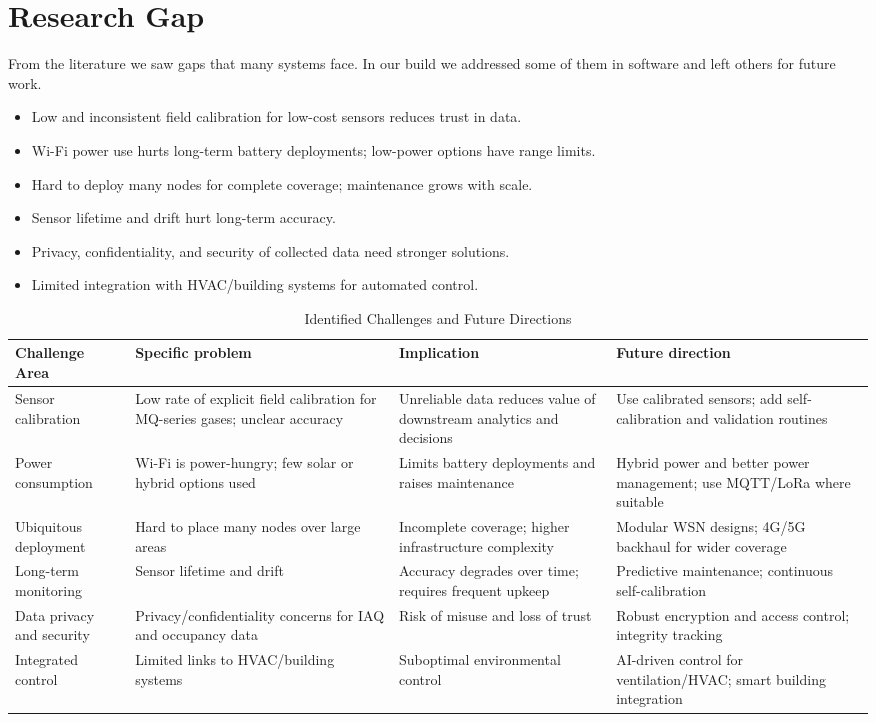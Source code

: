 \documentclass[12pt]{report}
\begin{document}
\section{Research Gap}
From the literature we saw gaps that many systems face. In our build we addressed some of them in software and left others for future work.
\begin{itemize}
  \item Low and inconsistent field calibration for low-cost sensors reduces trust in data.
  \item Wi-Fi power use hurts long-term battery deployments; low-power options have range limits.
  \item Hard to deploy many nodes for complete coverage; maintenance grows with scale.
  \item Sensor lifetime and drift hurt long-term accuracy.
  \item Privacy, confidentiality, and security of collected data need stronger solutions.
  \item Limited integration with HVAC/building systems for automated control.
\end{itemize}

\begin{table}[h]
\centering
\small
\caption{Identified Challenges and Future Directions}
\begin{tabularx}{\textwidth}{|p{3cm}|X|X|X|}
\hline
\textbf{Challenge Area} & \textbf{Specific problem} & \textbf{Implication} & \textbf{Future direction} \\
\hline
Sensor calibration & Low rate of explicit field calibration for MQ-series gases; unclear accuracy & Unreliable data reduces value of downstream analytics and decisions & Use calibrated sensors; add self-calibration and validation routines \\
\hline
Power consumption & Wi-Fi is power-hungry; few solar or hybrid options used & Limits battery deployments and raises maintenance & Hybrid power and better power management; use MQTT/LoRa where suitable \\
\hline
Ubiquitous deployment & Hard to place many nodes over large areas & Incomplete coverage; higher infrastructure complexity & Modular WSN designs; 4G/5G backhaul for wider coverage \\
\hline
Long-term monitoring & Sensor lifetime and drift & Accuracy degrades over time; requires frequent upkeep & Predictive maintenance; continuous self-calibration \\
\hline
Data privacy and security & Privacy/confidentiality concerns for IAQ and occupancy data & Risk of misuse and loss of trust & Robust encryption and access control; integrity tracking \\
\hline
Integrated control & Limited links to HVAC/building systems & Suboptimal environmental control & AI-driven control for ventilation/HVAC; smart building integration \\
\hline
\end{tabularx}
\end{table}
\FloatBarrier
\end{document}

